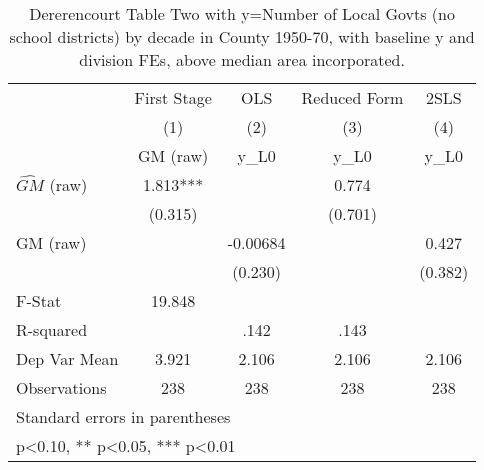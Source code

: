 \begin{table}[htbp]\centering
\def\sym#1{\ifmmode^{#1}\else\(^{#1}\)\fi}
\caption{Dererencourt Table Two with y=Number of Local Govts (no school districts) by decade in County 1950-70, with baseline y and division FEs, above median area incorporated.}
\begin{tabular}{l*{4}{c}}
\toprule
                    & First Stage   &         OLS   &Reduced Form   &        2SLS   \\
                    &\multicolumn{1}{c}{(1)}&\multicolumn{1}{c}{(2)}&\multicolumn{1}{c}{(3)}&\multicolumn{1}{c}{(4)}\\
                    &\multicolumn{1}{c}{GM  (raw)}&\multicolumn{1}{c}{y\_L0}&\multicolumn{1}{c}{y\_L0}&\multicolumn{1}{c}{y\_L0}\\
\midrule
$\hat{GM}$ (raw)    &       1.813***&               &       0.774   &               \\
                    &     (0.315)   &               &     (0.701)   &               \\
\addlinespace
GM  (raw)           &               &    -0.00684   &               &       0.427   \\
                    &               &     (0.230)   &               &     (0.382)   \\
\midrule
F-Stat              &      19.848   &               &               &               \\
R-squared           &               &        .142   &        .143   &               \\
Dep Var Mean        &       3.921   &       2.106   &       2.106   &       2.106   \\
Observations        &         238   &         238   &         238   &         238   \\
\bottomrule
\multicolumn{5}{l}{\footnotesize Standard errors in parentheses}\\
\multicolumn{5}{l}{\footnotesize * p<0.10, ** p<0.05, *** p<0.01}\\
\end{tabular}
\end{table}
